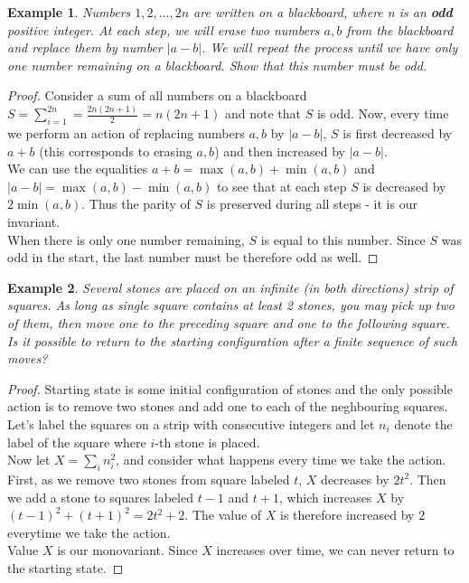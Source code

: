 \documentclass[11pt,a5paper]{article}
\newtheorem{theorem}{Example}
\begin{document}
\begin{theorem}
Numbers $1,2,\dots,2n$ are written on a blackboard, where n is an \textbf{odd} positive integer. At each step, we will erase two numbers $a, b$ from the blackboard and replace them by number $|a - b|$. We will repeat the process until we have only one number remaining on a blackboard. Show that this number must be odd.
\end{theorem}
\begin{proof}
Consider a sum of all numbers on a blackboard \\ $S = \sum_{i = 1}^{2n} = \frac{2n(2n+1)}{2} = n(2n + 1)$ and note that $S$ is odd. Now, every time we perform an action of replacing numbers $a, b$ by $|a - b|$, $S$ is first decreased by $a + b$ (this corresponds to erasing $a, b$) and then increased by $|a - b|$.\\
We can use the equalities $a + b = \max{(a,b)} + \min{(a,b)}$ and $|a - b| = \max{(a,b)} - \min{(a,b)}$ to see that at each step $S$ is decreased by $2\min{(a,b)}$. Thus the parity of $S$ is preserved during all steps - it is our invariant. \\
When there is only one number remaining, $S$ is equal to this number. Since $S$ was odd in the start, the last number must be therefore odd as well. 

\end{proof}

\begin{theorem}
	Several stones are placed on an infinite (in both directions) strip of squares. As long as single square contains at least 2 stones, you may pick up two of them, then move one to the preceding square and one to the following square. Is it possible to return to the starting configuration after a finite sequence of such moves?
\end{theorem}
\begin{proof}
	Starting state is some initial configuration of stones and the only possible action is to remove two stones and add one to each of the neghbouring squares.\\
Let's label the squares on a strip with consecutive integers and let $n_i$ denote the label of the square where $i$-th stone is placed.\\ 
Now let $X = \sum_{i}{n_i^2}$, and consider what happens every time we take the action. First, as we remove two stones from square labeled $t$, $X$ decreases by $2t^2$. Then we add a stone to squares labeled $t-1$ and $t+1$, which increases $X$ by $(t-1)^2 + (t+1)^2 = 2t^2 + 2$. The value of $X$ is therefore increased by $2$ everytime we take the action. \\
Value $X$ is our monovariant. Since $X$ increases over time, we can never return to the starting state.
\end{proof}
\end{document}
